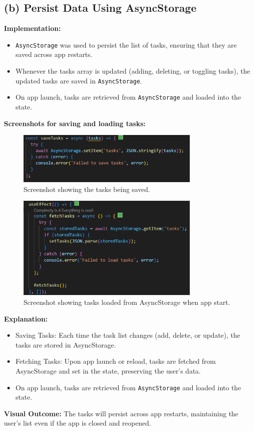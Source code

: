 \documentclass[12pt]{article}
\begin{document}
\subsection*{(b) Persist Data Using AsyncStorage }
\textbf{Implementation:}  
\begin{itemize}[left=1.5em]
    \item \texttt{AsyncStorage} was used to persist the list of tasks, ensuring that they are saved across app restarts.
    \item Whenever the tasks array is updated (adding, deleting, or toggling tasks), the updated tasks are saved in \texttt{AsyncStorage}.
    \item On app launch, tasks are retrieved from \texttt{AsyncStorage} and loaded into the state.
\end{itemize}
\textbf{Screenshots for saving and loading tasks:}  
\begin{figure}[H]
    \centering
    \includegraphics[width=0.8\textwidth]{images/async1.png} 
    \caption{Screenshot showing the tasks being saved.}
    \label{fig:asyncstorage-save}
\end{figure}
\begin{figure}[H]
    \centering
    \includegraphics[width=0.8\textwidth]{images/async2.png} 
    \caption{Screenshot showing tasks loaded from AsyncStorage when app start.}
    \label{fig:asyncstorage-load}
\end{figure}
\textbf{Explanation:}  
\begin{itemize}[left=1.5em]
    \item Saving Tasks: Each time the task list changes (add, delete, or update), the tasks are stored in AsyncStorage.
    \item Fetching Tasks: Upon app launch or reload, tasks are fetched from AsyncStorage and set in the state, preserving the user's data.
    \item On app launch, tasks are retrieved from \texttt{AsyncStorage} and loaded into the state.
\end{itemize}
\textbf{Visual Outcome:}  
The tasks will persist across app restarts, maintaining the user's list even if the app is closed and reopened.
\end{document}
